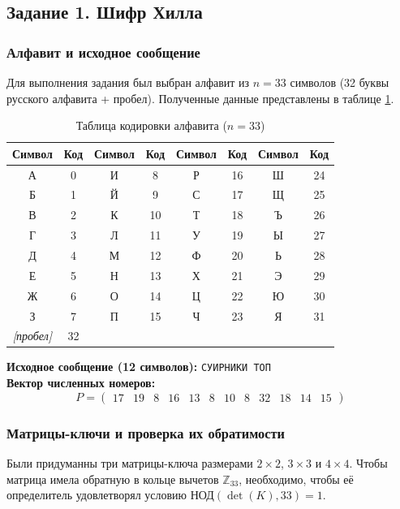 \subsection{Задание 1. Шифр Хилла}

\subsubsection{Алфавит и исходное сообщение}
Для выполнения задания был выбран алфавит из $n = 33$ символов (32 буквы русского алфавита + пробел). Полученные данные представлены в таблице \ref{tab:code_tab}.

\begin{table}[h!]
    \centering
    \caption{Таблица кодировки алфавита ($n = 33$)}
    \label{tab:code_tab}
    \begin{tabular}{|c|c||c|c||c|c||c|c|}
        \hline
        \textbf{Символ} & \textbf{Код} & \textbf{Символ} & \textbf{Код} & \textbf{Символ} & \textbf{Код} & \textbf{Символ} & \textbf{Код} \\ \hline
        А & 0  & И & 8  & Р & 16 & Ш & 24 \\ \hline
        Б & 1  & Й & 9  & С & 17 & Щ & 25 \\ \hline
        В & 2  & К & 10 & Т & 18 & Ъ & 26 \\ \hline
        Г & 3  & Л & 11 & У & 19 & Ы & 27 \\ \hline
        Д & 4  & М & 12 & Ф & 20 & Ь & 28 \\ \hline
        Е & 5  & Н & 13 & Х & 21 & Э & 29 \\ \hline
        Ж & 6  & О & 14 & Ц & 22 & Ю & 30 \\ \hline
        З & 7  & П & 15 & Ч & 23 & Я & 31 \\ \hline
        \textit{[пробел]} & 32 & & & & & & \\ \hline
    \end{tabular}
\end{table}

\noindent \textbf{Исходное сообщение (12 символов):} \texttt{СУИРНИКИ ТОП} \\
\textbf{Вектор численных номеров:} 
\[
P = \begin{pmatrix} 17 & 19 & 8 & 16 & 13 & 8 & 10 & 8 & 32 & 18 & 14 & 15 \end{pmatrix}
\]

\subsubsection{Матрицы-ключи и проверка их обратимости}
Были придуманны три матрицы-ключа размерами $2\times2$, $3\times3$ и $4\times4$. Чтобы матрица имела обратную в кольце вычетов $\mathbb{Z}_{33}$, необходимо, чтобы её определитель удовлетворял условию $\text{НОД}(\det(K), 33) = 1$.

